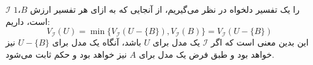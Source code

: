 \documentclass[]{exam}
\begin{document}
$\mathscr{I}$ را یک تفسیر دلخواه در نظر می‌گیریم،
از آنجایی که به ازای هر تفسیر ارزش $B$،$1$ است، داریم:
$$V_{\mathscr{I}}(U) = \min \lbrace V_{\mathscr{I}}(U - \lbrace B \rbrace), V_{\mathscr{I}}(B) \rbrace
    = V_{\mathscr{I}}(U - \lbrace B \rbrace)
$$
این بدین معنی است که اگر $\mathscr{I}$ یک مدل برای $U$ باشد،
آنگاه یک مدل برای $U - \lbrace B \rbrace$ نیز خواهد بود
و طبق فرض یک مدل برای $A$ نیز خواهد بود و حکم ثابت می‌شود.
\end{document}
